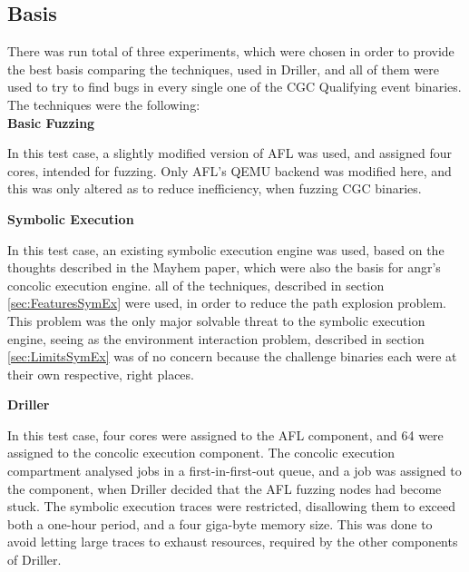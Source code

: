 \documentclass[a4paper]{article}
\newcommand{\tbf}[1]{\textbf{#1}}
\newcommand{\subsubsubsection}[1]{\tbf{#1}}
\newcommand{\marginwidth}{0.5cm}
\begin{document}
\subsection{Basis}
\label{sec:Basis}
There was run total of three experiments, which were chosen in order to provide the best basis comparing the techniques, used in Driller, and all of them were used to try to find bugs in every single one of the CGC Qualifying event binaries. The techniques were the following:\\
\subsubsubsection{Basic Fuzzing}
\begin{addmargin}[\marginwidth]{0cm}
In this test case, a slightly modified version of AFL was used, and assigned four cores, intended for fuzzing. Only AFL's QEMU backend was modified  here, and this was only altered as to reduce inefficiency, when fuzzing CGC binaries. 
\end{addmargin}
\subsubsubsection{Symbolic Execution}
\begin{addmargin}[\marginwidth]{0cm}
In this test case, an existing symbolic execution engine was used, based on the thoughts described in the Mayhem paper\cite{Mayhem}, which were also the basis for angr's concolic execution engine. all of the techniques, described in section \ref{sec:FeaturesSymEx} were used, in order to reduce the path explosion problem. This problem was the only major solvable threat to the symbolic execution engine, seeing as the environment interaction problem, described in section \ref{sec:LimitsSymEx} was of no concern because the challenge binaries each were at their own respective, right places.
\end{addmargin}
\subsubsubsection{Driller}
\begin{addmargin}[\marginwidth]{0cm}
In this test case, four cores were assigned to the AFL component, and 64 were assigned to the concolic execution component. The concolic execution compartment analysed jobs in a first-in-first-out queue, and a job was assigned to the component, when Driller decided that the AFL fuzzing nodes had become stuck. The symbolic execution traces were restricted, disallowing them to exceed both a one-hour period, and a four giga-byte memory size. This was done to avoid letting large traces to exhaust resources, required by the other components of Driller.
\end{addmargin}
\end{document}
